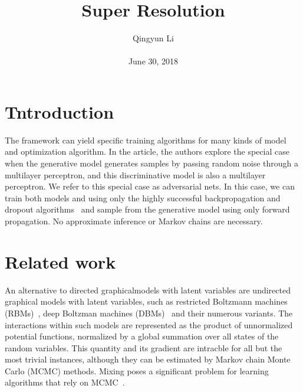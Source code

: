 \documentclass[10pt,twocolumn,letterpaper]{article}
\begin{document}
\author{Qingyun Li\\\\
June 30, 2018}        
\title{Super Resolution}

\maketitle

\section{Tntroduction}
\par The  framework can yield specific training algorithms for many kinds of model and optimization algorithm. In the article, the authors explore the special case when the generative model generates samples by passing random noise through a multilayer perceptron, and this discriminative model is also a multilayer perceptron. We refer to this special case as adversarial nets. In this case, we can train both models and using only the highly successful backpropagation and dropout algorithms~\cite{Hinton2012Improving} and sample from the generative model using only forward propagation. No approximate inference or Markov chains are necessary.
\section{Related work}
\par An alternative to directed graphicalmodels with latent variables are undirected graphical models with latent variables, such as restricted Boltzmann machines (RBMs)~\cite{smolensky1986information}, deep Boltzman machines (DBMs)~\cite{salakhutdinov2010efficient} and their numerous variants. The interactions within such models are represented as the product of unnormalized potential functions, normalized by a global summation over all states of the random variables. This quantity and its gradient are intracble for all but the most trivial instances, although they can be estimated by Markov chain Monte Carlo (MCMC) methods. Mixing poses a significant problem for learning algorithms that rely on MCMC~\cite{bengio2013better}.
  
 
\end{document}
